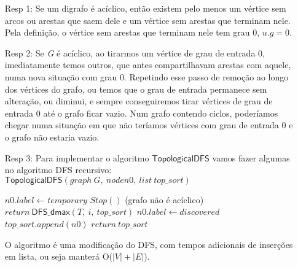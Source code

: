 \documentclass{homework}
\begin{document}
    \begin{enumerate}
        \item[Resp 1:] Se um digrafo é acíclico, então existem pelo menos um vértice sem arcos ou arestas que saem dele e um vértice sem arestas que terminam nele. Pela definição, o vértice sem arestas que terminam nele tem grau 0, $u.g = 0$.
        \item[Resp 2:] Se \textit{G} é acíclico, ao tirarmos um vértice de grau de entrada 0, imediatamente temos outros, que antes compartilhavam arestas com aquele, numa nova situação com grau 0. Repetindo esse passo de remoção ao longo dos vértices do grafo, ou temos que o grau de entrada permanece sem alteração, ou diminui, e sempre conseguiremos tirar vértices de grau de entrada 0 até o grafo ficar vazio. Num grafo contendo ciclos, poderíamos chegar numa situação em que não teríamos vértices com grau de entrada 0 e o grafo não estaria vazio.

\pagebreak        
        
        \item[Resp 3:] Para implementar o algoritmo $\mathsf{TopologicalDFS}$ vamos fazer algumas no algoritmo DFS recursivo:
         $\mathsf{TopologicalDFS}(graph\ G,\ node n0,\ list\ top\_sort)$
             \begin{algorithmic}[1]
			    \State $n0.label \gets temporary$
			                \State $Stop()$ (grafo não é acíclico)
			            \EndIf
			            \State $return\ \mathsf{DFS\_dmax}(T,\ i,\ top\_sort)$
			        \EndIf
			    \EndFor
			    \State $n0.label \gets discovered$
			    \State $top\_sort.append(n0)$			    
			    \State $return\ top\_sort$
			\end{algorithmic}
			O algoritmo é uma modificação do DFS, com tempos adicionais de inserções em lista, ou seja manterá O($|V|+|E|$).
    \end{enumerate}
\end{document}
